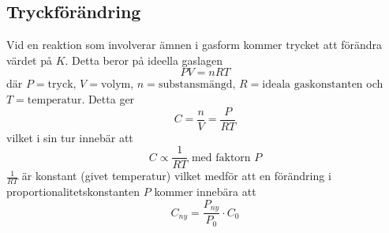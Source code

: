 \subsection{Tryckförändring}

Vid en reaktion som involverar ämnen i gasform kommer trycket att förändra värdet på $K$. Detta beror på ideella gaslagen
\begin{equation*}
    PV = nRT
\end{equation*}
där $P = \text{tryck}$, $V = \text{volym}$, $n = \text{substansmängd}$, $R = \text{ideala gaskonstanten}$ och $T = \text{temperatur}$. Detta ger
\begin{equation*}
    C = \frac{n}{V} = \frac{P}{RT}
\end{equation*}
vilket i sin tur innebär att
\begin{equation*}
    C \propto \frac{1}{RT} \text{ med faktorn } P
\end{equation*}
$\frac{1}{RT}$ är konstant (givet temperatur) vilket medför att en förändring i proportionalitetskonstanten $P$ kommer innebära att
\begin{equation*}
    C_{ny} = \frac{P_{ny}}{P_0} \cdot C_0
\end{equation*}